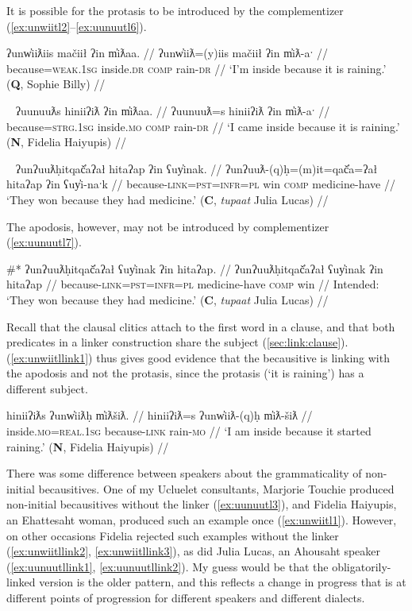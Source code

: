 It is possible for the protasis to be introduced by the complementizer (\ref{ex:unwiitl2}--\ref{ex:uunuutl6}). 

\ex \label{ex:unwiitl2}
\begingl
\glpreamble ʔunw̓iiƛiis mačiił ʔin m̓iƛaa. //
\gla ʔunw̓iiƛ=(y)iis mačiił ʔin m̓iƛ-aˑ //
\glb because=\textsc{weak.1sg} inside.\textsc{dr} \textsc{comp} rain-\textsc{dr} //
\glft `I'm inside because it is raining.' (\textbf{Q}, Sophie Billy) //
\endgl
\xe

\ex~ \label{ex:uunuutl5}
\begingl
\glpreamble ʔuunuuƛs hiniiʔiƛ ʔin m̓iƛaa. //
\gla ʔuunuuƛ=s hiniiʔiƛ ʔin m̓iƛ-aˑ //
\glb because=\textsc{strg.1sg} inside.\textsc{mo} \textsc{comp} rain-\textsc{dr} //
\glft `I came inside because it is raining.' (\textbf{N}, Fidelia Haiyupis) //
\endgl
\xe

\ex~ \label{ex:uunuutl6}
\begingl
\glpreamble ʔunʔuuƛḥitqač̓aʔał hitaʔap ʔin ʕuy̓inak. //
\gla ʔunʔuuƛ-(q)ḥ=(m)it=qač̓a=ʔał hitaʔap ʔin ʕuy̓i-naˑk //
\glb because-\textsc{link}=\textsc{pst}=\textsc{infr}=\textsc{pl} win \textsc{comp} medicine-have //
\glft `They won because they had medicine.' (\textbf{C}, \textit{tupaat} Julia Lucas) //
\endgl
\xe

The apodosis, however, may not be introduced by complementizer (\ref{ex:uunuutl7}).

\ex \label{ex:uunuutl7}
\begingl
\glpreamble \#* ʔunʔuuƛḥitqač̓aʔał ʕuy̓inak ʔin hitaʔap. //
\gla ʔunʔuuƛḥitqač̓aʔał ʕuy̓inak ʔin hitaʔap //
\glb because-\textsc{link}=\textsc{pst}=\textsc{infr}=\textsc{pl} medicine-have \textsc{comp} win //
\glft Intended: `They won because they had medicine.' (\textbf{C}, \textit{tupaat} Julia Lucas) //
\endgl
\xe

Recall that the clausal clitics attach to the first word in a clause, and that both predicates in a linker construction share the subject (\ref{sec:link:clause}). (\ref{ex:unwiitllink1}) thus gives good evidence that the becausitive is linking with the apodosis and not the protasis, since the protasis (`it is raining') has a different subject.

\ex \label{ex:unwiitllink1}
\begingl
\glpreamble hiniiʔiƛs ʔunw̓iiƛḥ m̓iƛšiƛ. //
\gla hiniiʔiƛ=s ʔunw̓iiƛ-(q)ḥ m̓iƛ-šiƛ //
\glb inside.\textsc{mo}=\textsc{real.1sg} because-\textsc{link} rain-\textsc{mo} //
\glft `I am inside because it started raining.' (\textbf{N}, Fidelia Haiyupis) //
\endgl
\xe

There was some difference between speakers about the grammaticality of non-initial becausitives. One of my Ucluelet consultants, Marjorie Touchie produced non-initial becausitives without the linker (\ref{ex:uunuutl3}), and Fidelia Haiyupis, an Ehattesaht woman, produced such an example once (\ref{ex:unwiitl1}). However, on other occasions Fidelia rejected such examples without the linker (\ref{ex:unwiitllink2}, \ref{ex:unwiitllink3}), as did Julia Lucas, an Ahousaht speaker (\ref{ex:uunuutllink1}, \ref{ex:uunuutllink2}). My guess would be that the obligatorily-linked version is the older pattern, and this reflects a change in progress that is at different points of progression for different speakers and different dialects.

